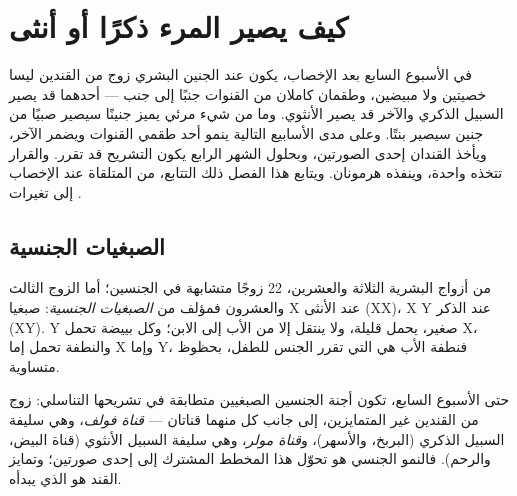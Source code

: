\chapter{كيف يصير المرء ذكرًا أو أنثى}\label{ch:g11:becoming-male-female}

في الأسبوع السابع بعد الإخصاب، يكون عند الجنين البشري زوج من القندين
ليسا خصيتين ولا مبيضين، وطقمان كاملان من القنوات جنبًا إلى جنب ---
أحدهما قد يصير السبيل الذكري والآخر قد يصير الأنثوي. وما من شيء مرئي
يميز جنينًا سيصير صبيًا من جنين سيصير بنتًا. وعلى مدى الأسابيع التالية
ينمو أحد طقمي القنوات ويضمر الآخر، ويأخذ القندان إحدى الصورتين، وبحلول
الشهر الرابع يكون التشريح قد تقرر. والقرار تتخذه  واحدة، وينفذه
هرمونان. ويتابع هذا الفصل ذلك التتابع، من  المتلقاة عند الإخصاب
إلى تغيرات .

\section{الصبغيات الجنسية}

\begin{definition}\label{def:g11:becoming-male-female:chromosomes}
من أزواج  البشرية الثلاثة والعشرين، 22 زوجًا متشابهة في
الجنسين؛ أما الزوج الثالث والعشرون فمؤلف من \emph{الصبغيات
الجنسية}: صبغيا X عند الأنثى (XX)،  X  Y
عند الذكر (XY).  Y صغير، يحمل  قليلة، ولا ينتقل إلا من
الأب إلى الابن؛ وكل بييضة تحمل X، والنطفة تحمل إما X وإما Y، فنطفة
الأب هي التي تقرر الجنس  للطفل، بحظوظ متساوية.
\end{definition}

\begin{proposition}\label{prop:g11:becoming-male-female:undifferentiated}
حتى الأسبوع السابع، تكون أجنة الجنسين الصبغيين متطابقة في تشريحها
التناسلي: زوج من القندين غير المتمايزين، إلى جانب كل منهما قناتان ---
\emph{قناة فولف}، وهي سليفة السبيل الذكري (البربخ، والأسهر)،
و\emph{قناة مولر}، وهي سليفة السبيل الأنثوي (قناة البيض، والرحم).
فالنمو الجنسي هو تحوّل هذا المخطط المشترك إلى إحدى صورتين؛ وتمايز
القند هو الذي يبدأه.
\end{proposition}
\admitted

